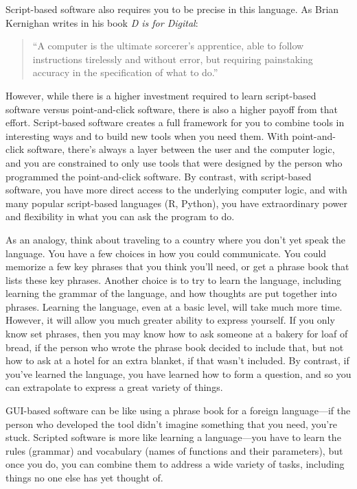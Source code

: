 \documentclass[]{tufte-book}
\begin{document}
Script-based software also requires you to be precise in this language. As Brian
Kernighan writes in his book \emph{D is for Digital}:

\begin{quote}
``A computer is the ultimate sorcerer's apprentice, able to follow instructions
tirelessly and without error, but requiring painstaking accuracy in the
specification of what to do.'' \citep{kernighan2011d}
\end{quote}

However, while there is a higher investment required to learn script-based
software versus point-and-click software, there is also a higher payoff from
that effort. Script-based software creates a full framework for you to
combine tools in interesting ways and to build new tools when you need them.
With point-and-click software, there's always a layer between the user and
the computer logic, and you are constrained to only use tools that were
designed by the person who programmed the point-and-click software. By
contrast, with script-based software, you have more direct access to the
underlying computer logic, and with many popular script-based languages
(R, Python), you have extraordinary power and flexibility in what you can
ask the program to do.

As an analogy, think about traveling to a country where you don't yet speak the
language. You have a few choices in how you could communicate. You could
memorize a few key phrases that you think you'll need, or get a phrase book that
lists these key phrases. Another choice is to try to learn the language,
including learning the grammar of the language, and how thoughts are put
together into phrases. Learning the language, even at a basic level, will take
much more time. However, it will allow you much greater ability to express
yourself. If you only know set phrases, then you may know how to ask someone at
a bakery for loaf of bread, if the person who wrote the phrase book decided to
include that, but not how to ask at a hotel for an extra blanket, if that wasn't
included. By contrast, if you've learned the language, you have learned how to
form a question, and so you can extrapolate to express a great variety of
things.

GUI-based software can be like using a phrase book for a foreign
language---if the person who developed the tool didn't imagine something that
you need, you're stuck. Scripted software is more like learning a language---you
have to learn the rules (grammar) and vocabulary (names of functions and
their parameters), but once you do, you can combine them to address a wide
variety of tasks, including things no one else has yet thought of.
\end{document}
